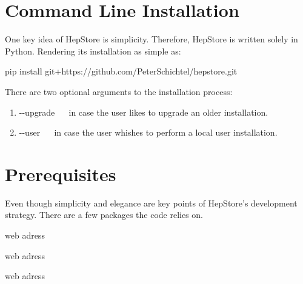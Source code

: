 
\section{Command Line Installation}
One key idea of HepStore is simplicity. Therefore, HepStore is written
solely in Python. Rendering its installation as simple as:
%
\begin{framed}
  \begin{center}
    pip install  git+https://github.com/PeterSchichtel/hepstore.git
  \end{center}
\end{framed}
%
There are two optional arguments to the installation process:
%
\begin{enumerate}
\item -{}-upgrade ~~ in case the user likes to upgrade an older installation.
\item -{}-user ~~ in case the user whishes to perform a local user installation.
\end{enumerate}
%

\section{Prerequisites}
Even though simplicity and elegance are key points of HepStore's
development strategy. There are a few packages the code relies on.
%
\begin{description}
\item[Python 2.7] web adress
\item[pip] web adress
\item[Docker] web adress
\end{description}
%
